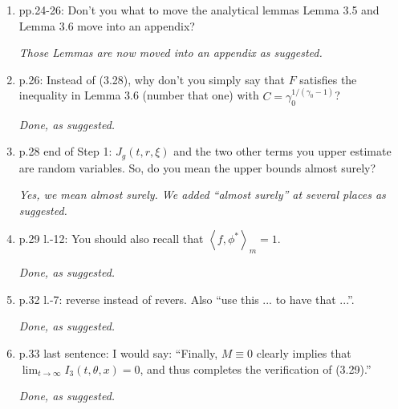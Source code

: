 \documentclass[12pt,a4paper]{amsart}
\numberwithin{equation}{section}
\theoremstyle{plain}
\theoremstyle{definition}
\begin{document}
\begin{enumerate}
  {\it The prove of this Lemma is simplified and the concerned argument is deleted.}
\item
  pp.24-26: Don't you what to move the analytical lemmas Lemma 3.5 and Lemma 3.6 move into an appendix?

  {\it Those Lemmas are now moved into an appendix as suggested.}
\item
  p.26: Instead of (3.28), why don't you simply say that $F$ satisfies the inequality in Lemma 3.6 (number that one) with $C = \gamma_0^{1/(\gamma_0 - 1)}$?

  {\it 
    Done, as suggested.}
\item
  p.28 end of Step 1: $J_g(t,r,\xi)$ and the two other terms you upper estimate are random variables.
  So, do you mean the upper bounds almost surely?

  {\it Yes, we mean almost surely.
  We added ``almost surely'' at several places as suggested.}
\item
  p.29 l.-12: You should also recall that $\left\langle f, \phi^* \right\rangle_m = 1$.

  {\it Done, as suggested.}
\item
  p.32 l.-7: reverse instead of revers.
  Also ``use this ... to have that ...''.

  {\it Done, as suggested.}
\item
  p.33 last sentence: I would say: ``Finally, $M \equiv 0$ clearly implies that $\lim_{t\to \infty} I_3(t,\theta,x) = 0$, and thus completes the verification of (3.29).''

  {\it Done, as suggested.}
\end{enumerate}


\end{document}
